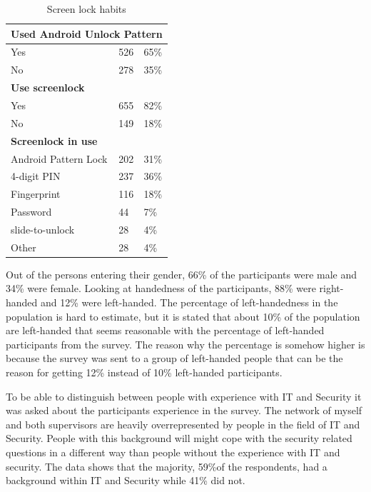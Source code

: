 \begin{table}[H]
{\begin{tabular}{ l | l l }
          \multicolumn{3}{l}{\bf Used Android Unlock Pattern} \\ \hline
          Yes & 526 & 65\% \\ 
          No & 278 & 35\% \\ \hline

          \multicolumn{3}{l}{\bf Use screenlock} \\ \hline
          Yes & 655 & 82\% \\
          No & 149 & 18\% \\ \hline

          \multicolumn{3}{l}{\bf Screenlock in use} \\ \hline
          Android Pattern Lock & 202 & 31\% \\
          4-digit PIN & 237 & 36\% \\
          Fingerprint & 116 & 18\% \\
          Password & 44 & 7\% \\
          slide-to-unlock & 28 & 4\% \\
          Other & 28 & 4\% \\ \hline
        \end{tabular}
        \caption{Screen lock habits}
        \label{tab:screenlockHabits}
      }
    \end{table}

    Out of the persons entering their gender, 66\% of the participants were male and 34\% were female. Looking at handedness of the participants, 88\% were right-handed and 12\% were left-handed. The percentage of left-handedness in the population is hard to estimate, but it is stated that about 10\% of the population are left-handed \cite{lefthandedness} that seems reasonable with the percentage of left-handed participants from the survey. The reason why the percentage is somehow higher is because the survey was sent to a group of left-handed people that can be the reason for getting 12\% instead of 10\% left-handed participants.
    
    To be able to distinguish between people with experience with IT and Security it was asked about the participants experience in the survey. The network of myself and both supervisors are heavily overrepresented by people in the field of IT and Security. People with this background will might cope with the security related questions in a different way than people without the experience with IT and security. The data shows that the majority, 59\%of the respondents, had a background within IT and Security while 41\% did not. 

